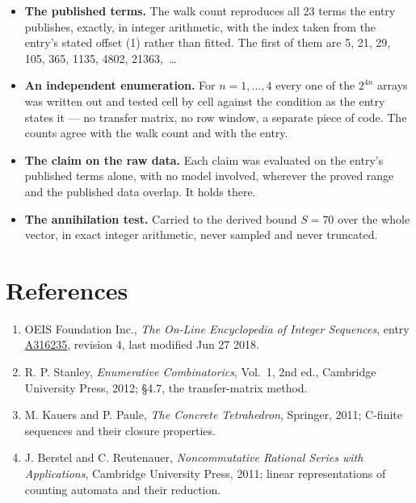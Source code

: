 \documentclass[11pt]{article}
\theoremstyle{definition}
\begin{document}
\begin{itemize}

\item {\bfseries The published terms.} The walk count reproduces all 23 terms the entry publishes, exactly, in integer arithmetic, with the index taken from the entry's stated offset (1) rather than fitted. The first of them are 5, 21, 29, 105, 365, 1135, 4802, 21363,~\dots

\item {\bfseries An independent enumeration.} For $n = 1,\dots,4$ every one of the $2^{4n}$ arrays was written out and tested cell by cell against the condition as the entry states it --- no transfer matrix, no row window, a separate piece of code. The counts agree with the walk count and with the entry.

\item {\bfseries The claim on the raw data.} Each claim was evaluated on the entry's published terms alone, with no model involved, wherever the proved range and the published data overlap. It holds there.

\item {\bfseries The annihilation test.} Carried to the derived bound $S = 70$ over the whole vector, in exact integer arithmetic, never sampled and never truncated.

\end{itemize}

\section{References}

\begin{enumerate}

\item OEIS Foundation Inc., \emph{The On-Line Encyclopedia of Integer Sequences}, entry \href{https://oeis.org/A316235}{A316235}, revision 4, last modified Jun 27 2018.

\item R. P. Stanley, \emph{Enumerative Combinatorics}, Vol.~1, 2nd ed., Cambridge University Press, 2012; \S4.7, the transfer-matrix method.

\item M. Kauers and P. Paule, \emph{The Concrete Tetrahedron}, Springer, 2011; C-finite sequences and their closure properties.

\item J. Berstel and C. Reutenauer, \emph{Noncommutative Rational Series with Applications}, Cambridge University Press, 2011; linear representations of counting automata and their reduction.

\end{enumerate}
\end{document}
